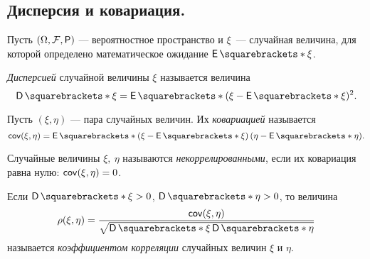 \subsection{Дисперсия и ковариация.}
Пусть \((\Omega, \F, \Pr)\) --- вероятностное пространство и \(\xi\)~--- 
случайная величина, для которой определено математическое ожидание \(\E{\xi}\).
\begin{definition}
	\emph{Дисперсией} случайной величины \(\xi\) называется величина 
	\[\D{\xi}=\E{(\xi - \E{\xi})^2}.\]
\end{definition}
\begin{definition}
	Пусть \((\xi, \eta)\) --- пара случайных величин. Их \emph{ковариацией} 
	называется \[\cov(\xi, \eta) = \E{\left(\xi - \E{\xi}\right)\left(\eta - 
	\E{\eta}\right)}.\]
\end{definition}
\begin{definition}
	Случайные величины \(\xi,\ \eta \) называются \emph{некоррелированными}, 
	если их ковариация равна нулю: \(\operatorname{\mathsf{cov}}(\xi, \eta) = 0\).
\end{definition}
\begin{definition}
	Если \(\D{\xi} > 0\), \(\D{\eta} > 0\), то величина \[\rho(\xi, \eta) = 
	\frac{\cov(\xi, \eta)}{\sqrt{\D{\xi}\D{\eta}}}\] называется 
	\emph{коэффициентом корреляции} случайных величин $ \xi $ и $ \eta $.
\end{definition}

